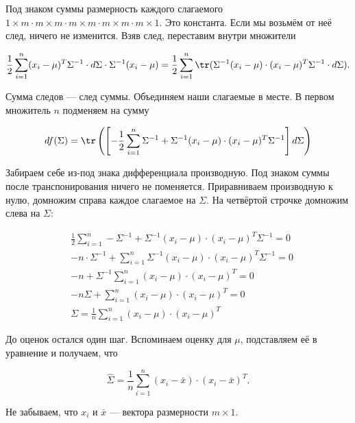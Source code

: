 \begin{sol}
Под знаком суммы размерность каждого слагаемого $1 \times m \cdot m \times m \cdot m \times m \cdot m \times m \cdot m \times 1$. Это константа. Если мы возьмём от неё след, ничего не изменится. Взяв след, переставим внутри множители

\[
\frac{1}{2} \sum_{i=1}^n (x_i - \mu)^T \Sigma^{-1} \cdot  d \Sigma \cdot \Sigma^{-1} (x_i - \mu)  = \frac{1}{2} \sum_{i=1}^n \tr( \Sigma^{-1} (x_i - \mu) \cdot (x_i - \mu)^T \Sigma^{-1} \cdot  d \Sigma). 
\] 

Сумма следов --- след суммы. Объединяем наши слагаемые в месте. В первом множитель $n$ подменяем на сумму 

\[
d f(\Sigma) = \tr \left( \left [ - \frac{1}{2} \sum_{i = 1}^n \Sigma^{-1} + \Sigma^{-1} (x_i - \mu) \cdot (x_i - \mu)^T \Sigma^{-1} \right] d \Sigma \right)
\]

Забираем себе из-под знака дифференциала производную. Под знаком суммы после транспонирования ничего не поменяется. Приравниваем производную к нулю, домножим справа каждое слагаемое на $\Sigma$. На четвёртой строчке домножим слева на $\Sigma$: 

\begin{equation*}
\begin{aligned} 
 & \frac{1}{2} \sum_{i = 1}^n - \Sigma^{-1} + \Sigma^{-1} (x_i - \mu) \cdot (x_i - \mu)^T \Sigma^{-1}  = 0 \\
 & - n \cdot \Sigma^{-1} + \sum_{i = 1}^n  \Sigma^{-1} (x_i - \mu) \cdot (x_i - \mu)^T \Sigma^{-1}  = 0 \\
 & - n + \Sigma^{-1} \sum_{i = 1}^n  (x_i - \mu) \cdot (x_i - \mu)^T = 0 \\
 & - n \Sigma+ \sum_{i = 1}^n  (x_i - \mu) \cdot (x_i - \mu)^T = 0 \\
 &  \Sigma  = \frac{1}{n} \sum_{i = 1}^n  (x_i - \mu) \cdot (x_i - \mu)^T 
\end{aligned}
\end{equation*}
	
До оценок остался один шаг. Вспоминаем оценку для $\mu$, подставляем её в уравнение и получаем, что 

\[
\hat \Sigma = \frac{1}{n} \sum_{i = 1}^n  (x_i - \bar x) \cdot (x_i - \bar x)^T.
\]
	
Не забываем, что $x_i$ и $\bar x$ --- вектора размерности $m \times 1$. 
\end{sol} 


